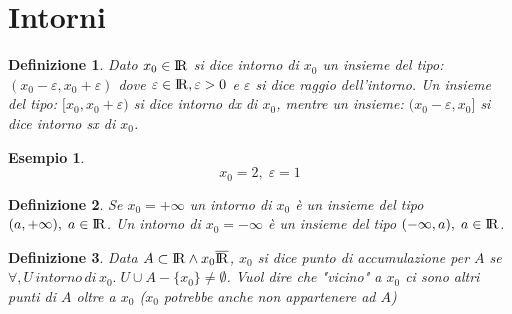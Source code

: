 \documentclass[12pt, a4paper]{article}
\theoremstyle{break}
\newtheorem{definition}{Definizione}[subsection]
\newtheorem{example}{Esempio}[subsection]
\newcommand\R{{\rm I\!R}}
\begin{document}
    \section{Intorni}
    \begin{definition}
        Dato $x_0\in\R$ si dice intorno di $x_0$ un  insieme del tipo: $(x_0-\varepsilon, x_0+\varepsilon)$
        dove $\varepsilon\in\R ,\varepsilon >0$ e $\varepsilon$ si dice raggio dell'intorno.\newline
        Un insieme del tipo: $[x_0,x_0+\varepsilon)$ si dice intorno dx di $x_0$,\newline
        mentre un insieme: $(x_0-\varepsilon, x_0]$ si dice intorno sx di $x_0$.
    \end{definition}
    \begin{example}
        \[x_0 = 2,\; \varepsilon = 1\]
        \begin{figure}[!htb]
            \centering
        \end{figure}
    \end{example}
    \begin{definition}
        Se $x_0 = +\infty$ un intorno di $x_0$ è un insieme del tipo $(a,+\infty),\;a\in\R$.\newline
        Un intorno di $x_0 = -\infty$ è un insieme del tipo $(-\infty, a),\;a\in\R$.
    \end{definition}
    \begin{definition}
        Data $A\subset\R \wedge x_0\overline{\R}$, $x_0$ si dice punto di accumulazione per $A$ se $\forall, U\, intorno\, di\, x_0.\; U\cup A-\{x_0\}\neq\emptyset$.\newline
        Vuol dire che "vicino" a $x_0$ ci sono altri punti di $A$ oltre a $x_0$ ($x_0$ potrebbe anche non appartenere ad $A$) 
    \end{definition}
\end{document}

